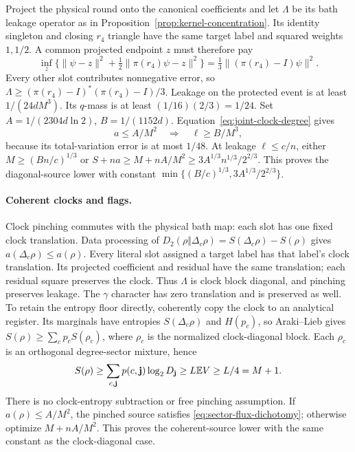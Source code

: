 Project the physical round onto the canonical coefficients and
let $\Lambda$ be its bath leakage operator as in
Proposition~\ref{prop:kernel-concentration}. Its identity singleton
and closing $r_4$ triangle have the same target label and squared
weights $1,1/2$. A common projected endpoint $z$ must therefore pay
\[
 \inf_z\{\|\psi-z\|^2+\tfrac12\|\pi(r_4)\psi-z\|^2\}
       =\tfrac13\|(\pi(r_4)-I)\psi\|^2.
\]
Every other slot contributes nonnegative error, so
$\Lambda\geq(\pi(r_4)-I)^*(\pi(r_4)-I)/3$.
Leakage on the protected event is at least $1/(24dM^3)$.
Its $q$-mass is at least $(1/16)(2/3)=1/24$.
Set $A=1/(2304d\ln2)$, $B=1/(1152d)$.
Equation~\eqref{eq:joint-clock-degree} gives
\begin{equation}\label{eq:sector-flux-dichotomy}
 a\leq A/M^2\quad\Longrightarrow\quad\ell\geq B/M^3,
\end{equation}
because its total-variation error is at most $1/48$.
At leakage $\ell\leq c/n$, either $M\geq(Bn/c)^{1/3}$ or
$S+na\geq M+nA/M^2\geq3A^{1/3}n^{1/3}/2^{2/3}$.
This proves the diagonal-source lower with constant
$\min\{(B/c)^{1/3},3A^{1/3}/2^{2/3}\}$.

\paragraph{Coherent clocks and flags.}
Clock pinching commutes with the physical bath map: each slot has
one fixed clock translation. Data processing of
$D_2(\rho\Vert\Delta_c\rho)=S(\Delta_c\rho)-S(\rho)$ gives
$a(\Delta_c\rho)\leq a(\rho)$.
Every literal slot assigned a target label has that label's clock
translation. Its projected coefficient and residual have the same
translation; each residual square preserves the clock. Thus $\Lambda$
is clock block diagonal, and pinching preserves leakage.
The $\gamma$ character has zero translation and is preserved as well.
To retain the entropy floor directly, coherently copy the clock to an
analytical register. Its marginals have entropies
$S(\Delta_c\rho)$ and $H(p_c)$, so Araki--Lieb gives
$S(\rho)\geq\sum_cp_cS(\rho_c)$, where $\rho_c$ is the normalized
clock-diagonal block. Each $\rho_c$ is an orthogonal degree-sector
mixture, hence
\[
 S(\rho)\geq\sum_{c,\mathbf j}p(c,\mathbf j)\log_2D_{\mathbf j}
        \geq L\mathbb E V\geq L/4=M+1.
\]
There is no clock-entropy subtraction or free pinching assumption.
If $a(\rho)\leq A/M^2$, the pinched source satisfies
\eqref{eq:sector-flux-dichotomy}; otherwise optimize $M+nA/M^2$.
This proves the coherent-source lower with the same constant as the
clock-diagonal case.

